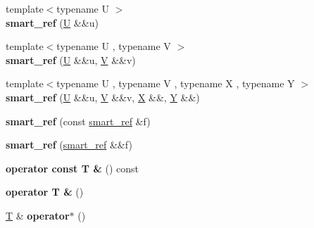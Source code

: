 \begin{DoxyCompactItemize}
\item 
\mbox{\label{classfc_1_1smart__ref_a0947bec23dbb370b8fb443b637ca295b}} 
{\footnotesize template$<$typename U $>$ }\\{\bfseries smart\+\_\+ref} (\mbox{\hyperlink{union_u}{U}} \&\&u)
\item 
\mbox{\label{classfc_1_1smart__ref_aa790989cd742a3b573b9fdf96b45e0d6}} 
{\footnotesize template$<$typename U , typename V $>$ }\\{\bfseries smart\+\_\+ref} (\mbox{\hyperlink{union_u}{U}} \&\&u, \mbox{\hyperlink{struct_v}{V}} \&\&v)
\item 
\mbox{\label{classfc_1_1smart__ref_ac341d324daa6df129bd2aaa3877a4a67}} 
{\footnotesize template$<$typename U , typename V , typename X , typename Y $>$ }\\{\bfseries smart\+\_\+ref} (\mbox{\hyperlink{union_u}{U}} \&\&u, \mbox{\hyperlink{struct_v}{V}} \&\&v, \mbox{\hyperlink{class_x}{X}} \&\&, \mbox{\hyperlink{struct_y}{Y}} \&\&)
\item 
\mbox{\label{classfc_1_1smart__ref_a80df2455155c3651e2f26a2927397b1a}} 
{\bfseries smart\+\_\+ref} (const \mbox{\hyperlink{classfc_1_1smart__ref}{smart\+\_\+ref}} \&f)
\item 
\mbox{\label{classfc_1_1smart__ref_ac90aa1a103deed7e5ad656bbdc4be2f5}} 
{\bfseries smart\+\_\+ref} (\mbox{\hyperlink{classfc_1_1smart__ref}{smart\+\_\+ref}} \&\&f)
\item 
\mbox{\label{classfc_1_1smart__ref_ab400289343cd963347d95e475a74470a}} 
{\bfseries operator const T \&} () const
\item 
\mbox{\label{classfc_1_1smart__ref_a02e822045528c3b2b7136aba53e46d86}} 
{\bfseries operator T \&} ()
\item 
\mbox{\label{classfc_1_1smart__ref_a16fec1f0e06c7bd17e43c6254b5d8e98}} 
\mbox{\hyperlink{struct_t}{T}} \& {\bfseries operator$\ast$} ()
\item 
\mbox{\label{classfc_1_1smart__ref_adf5b4cadd6f43472c5693a03bf54d80f}} 

\end{DoxyCompactItemize}
